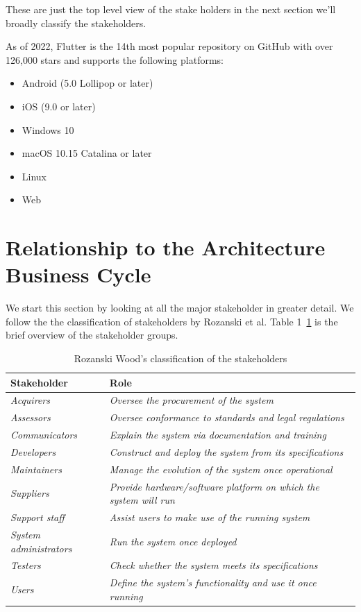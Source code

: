 \documentclass[conference, onecolumn]{IEEEtran}
\begin{document}
These are just the top level view of the stake holders in the next section we'll broadly classify the stakeholders.

As of 2022, Flutter is the 14th most popular repository on GitHub with over 126,000 stars and supports 
the following platforms:
\begin{itemize}
\item Android (5.0 Lollipop or later)
\item iOS (9.0 or later)
\item Windows 10
\item macOS 10.15 Catalina or later
\item Linux
\item Web
\end{itemize}

\section{Relationship to the Architecture Business Cycle}
We start this section by looking at all the major stakeholder in greater detail. We follow the the classification of stakeholders by Rozanski et al. Table 1~\ref{relationship} is the brief overview of the stakeholder groups.
\begin{table}[h]
    \centering
    \label{relationship}
    \begin{tabular}{|l|l|}
        \hline
        \textbf{Stakeholder} & \textbf{Role} \\
        \hline
        \textit{Acquirers} & \textit{Oversee the procurement of the system} \\
        \hline
        \textit{Assessors} & \textit{Oversee conformance to standards and legal regulations} \\
        \hline
        \textit{Communicators} & \textit{Explain the system via documentation and training} \\
        \hline
        \textit{Developers} & \textit{Construct and deploy the system from its specifications} \\
        \hline
        \textit{Maintainers} & \textit{Manage the evolution of the system once operational} \\
        \hline
        \textit{Suppliers} & \textit{Provide hardware/software platform on which the system will run} \\
        \hline
        \textit{Support staff} & \textit{Assist users to make use of the running system} \\
        \hline
        \textit{System administrators} & \textit{Run the system once deployed} \\
        \hline
        \textit{Testers} & \textit{Check whether the system meets its specifications} \\
        \hline
        \textit{Users} & \textit{Define the system’s functionality and use it once running} \\
        \hline
    \end{tabular} \\
    \caption{Rozanski Wood's classification of the stakeholders\cite{ssa}}
    \label{relationship}
\end{table}
\end{document}
